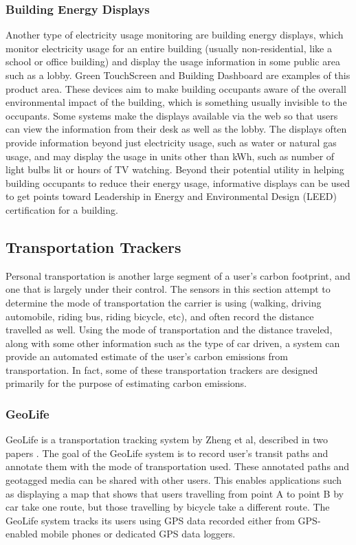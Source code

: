 \subsubsection{Building Energy Displays}

Another type of electricity usage monitoring are building energy displays, which monitor electricity usage for an entire building (usually non-residential, like a school or office building) and display the usage information in some public area such as a lobby. Green TouchScreen \cite{greentouchscreen} and Building Dashboard \cite{building-dashboard} are examples of this product area. These devices aim to make building occupants aware of the overall environmental impact of the building, which is something usually invisible to the occupants. Some systems make the displays available via the web so that users can view the information from their desk as well as the lobby. The displays often provide  information beyond just electricity usage, such as water or natural gas usage, and may display the usage in units other than kWh, such as number of light bulbs lit or hours of TV watching. Beyond their potential utility in helping building occupants to reduce their energy usage, informative displays can be used to get points toward Leadership in Energy and Environmental Design (LEED) certification for a building.

\subsection{Transportation Trackers}

Personal transportation is another large segment of a user's carbon footprint, and one that is largely under their control. The sensors in this section attempt to determine the mode of transportation the carrier is using (walking, driving automobile, riding bus, riding bicycle, etc), and often record the distance travelled as well. Using the mode of transportation and the distance traveled, along with some other information such as the type of car driven, a system can provide an automated estimate of the user's carbon emissions from transportation. In fact, some of these transportation trackers are designed primarily for the purpose of estimating carbon emissions.

\subsubsection{GeoLife}

GeoLife is a transportation tracking system by Zheng et al, described in two papers \cite{zheng-learning-mode-2008, Zheng2008Understanding-mobility}. The goal of the GeoLife system is to record user's transit paths and annotate them with the mode of transportation used. These annotated paths and geotagged media can be shared with other users. This enables applications such as displaying a map that shows that users travelling from point A to point B by car take one route, but those travelling by bicycle take a different route. The GeoLife system tracks its users using GPS data recorded either from GPS-enabled mobile phones or dedicated GPS data loggers.

